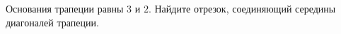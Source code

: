 \begin{ex}
	\begin{condition}
		 Основания трапеции равны \( 3  \) и \( 2 \). Найдите отрезок, соединяющий середины диагоналей трапеции.
	\end{condition}
\end{ex}